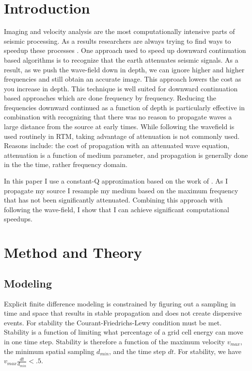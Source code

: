 \documentclass{paris17}
\begin{document}
\section{Introduction}

Imaging and velocity analysis are the most computationally intensive parts of seismic processing. As a results researchers are always trying to find ways to speedup these processes \cite[]{bednar,Stork}.  One approach used to speed up downward continuation based algorithms is to recognize that the earth attenuates seismic signals.  As a result, as we push the wave-field down in depth, we can ignore higher and higher frequencies and still obtain an accurate image\cite[]{Clapp.sep.111.bob3}.  This approach lowers the cost as you increase in depth. This technique is well suited for downward continuation based approaches which are done frequency by frequency.  Reducing the frequencies downward continued as a function of depth  is particularly effective in combination with recognizing that there was no reason to propagate waves a large distance from the source at early times.  While following the wavefield is used routinely in RTM,  taking advantage of attenuation is not commonly used.  Reasons include: the cost of propagation with an attenuated wave equation, attenuation is a function of medium parameter, and propagation is generally done in the the time, rather frequency domain.

In this paper I use a constant-Q approximation based on the work of \cite[]{zhu}.  As I propagate my source I resample my medium based on the maximum frequency that has not been significantly attenuated. Combining this approach with following the wave-field, I show that I can achieve significant computational speedups.

\section{Method and Theory}

\subsection{Modeling}

Explicit finite difference modeling is constrained by figuring  out a sampling in time and space that results in stable propagation and does not create dispersive events.  For stability the Courant-Friedrichs-Lewy condition \cite[]{courant1967partial} must be met.  Stability is a function of limiting what percentage of a grid cell energy can move in one time step. Stability is therefore a function of the maximum velocity $v_{max}$, the minimum spatial sampling $d_{min}$, and the time step $dt$. For stability, we have $v_{max}\frac{dt}{d_{min}} < .5$.
\end{document}
